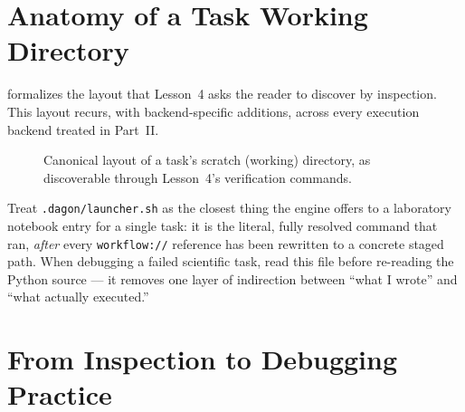 \section{Anatomy of a Task Working Directory}

 formalizes the layout that Lesson~4 asks the reader to
discover by inspection. This layout recurs, with backend-specific additions,
across every execution backend treated in Part~II.

\begin{figure}[h]
\centering
{}
\caption{Canonical layout of a task's scratch (working) directory, as
discoverable through Lesson~4's verification commands.}
\label{fig:task-dir}
\end{figure}

\begin{practicebox}
Treat \texttt{.dagon/launcher.sh} as the closest thing the engine offers to a
laboratory notebook entry for a single task: it is the literal, fully
resolved command that ran, \emph{after} every \texttt{workflow://} reference
has been rewritten to a concrete staged path. When debugging a failed
scientific task, read this file before re-reading the Python source --- it
removes one layer of indirection between ``what I wrote'' and ``what
actually executed.''
\end{practicebox}

\section{From Inspection to Debugging Practice}

